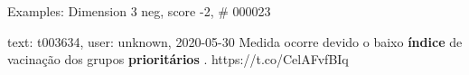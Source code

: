 \begin{frame}{Examples: Dimension 3 neg, score -2, \# 000023}
\footnotesize
\begin{alertblock}{text: t003634, user: unknown, 2020-05-30}
Medida ocorre devido o baixo \textbf{índice} de vacinação dos grupos 
\textbf{prioritários} . https://t.co/CelAFvfBIq 
\end{alertblock}
\end{frame}
